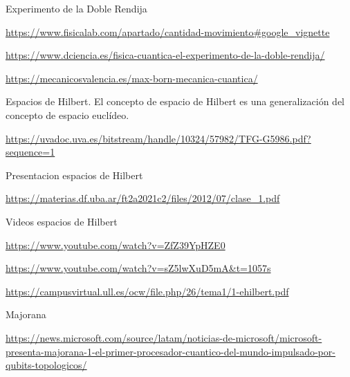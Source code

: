 \documentclass{article}
\numberwithin{equation}{section} %
\begin{document}
        Experimento de la Doble Rendija\par
        \url{https://www.fisicalab.com/apartado/cantidad-movimiento#google_vignette}
        \vspace{2mm}

        \url{https://www.dciencia.es/fisica-cuantica-el-experimento-de-la-doble-rendija/}
        \vspace{2mm}

        \url{https://mecanicosvalencia.es/max-born-mecanica-cuantica/}
        \vspace{2mm}

        Espacios de Hilbert. El concepto de espacio de Hilbert es una generalización del concepto de espacio euclídeo.\par
        \url{https://uvadoc.uva.es/bitstream/handle/10324/57982/TFG-G5986.pdf?sequence=1}
        \vspace{2mm}

        Presentacion espacios de Hilbert\par
        \url{https://materias.df.uba.ar/ft2a2021c2/files/2012/07/clase_1.pdf}
        \vspace{2mm}

        Videos espacios de Hilbert\par
        \url{https://www.youtube.com/watch?v=ZfZ39YpHZE0}
        \vspace{2mm}

        \url{https://www.youtube.com/watch?v=sZ5lwXuD5mA&t=1057s}
        \vspace{2mm}

        \url{https://campusvirtual.ull.es/ocw/file.php/26/tema1/1-ehilbert.pdf}
        \vspace{2mm}

        Majorana\par
        \url{https://news.microsoft.com/source/latam/noticias-de-microsoft/microsoft-presenta-majorana-1-el-primer-procesador-cuantico-del-mundo-impulsado-por-qubits-topologicos/}
        \vspace{2mm}
    
\end{document}
